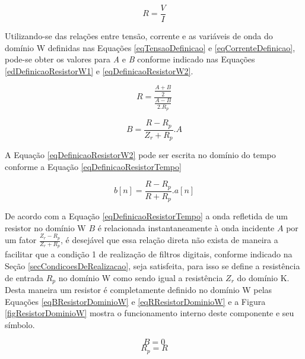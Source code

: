 	\begin{equation}
		\label{eqDefinicaoResistor}
		R = \frac{V}{I}
	\end{equation}
	
	Utilizando-se das relações entre tensão, corrente e as variáveis de onda do domínio W definidas nas Equações \ref{eqTensaoDefinicao} e \ref{eqCorrenteDefinicao}, pode-se obter os valores para \textit{A} e \textit{B} conforme indicado nas Equações \ref{edDefinicaoResistorW1} e \ref{eqDefinicaoResistorW2}.
	
	\begin{equation}
		\label{edDefinicaoResistorW1}
		R = \frac{\frac{A+B}{2}}{\frac{A-B}{2.R_p}}
	\end{equation}  
	
	\begin{equation}
		\label{eqDefinicaoResistorW2}
		B = \frac{R-R_p}{Z_r+R_p}.A
	\end{equation}
	
	A Equação \ref{eqDefinicaoResistorW2} pode ser escrita no domínio do tempo conforme a Equação \ref{eqDefinicaoResistorTempo}
	
	\begin{equation}
		\label{eqDefinicaoResistorTempo}
		b[n] = \frac{R-R_p}{R+R_p}.a[n]
	\end{equation}
	
	De acordo com a Equação \ref{eqDefinicaoResistorTempo} a onda refletida de um resistor no domínio W $B$ é relacionada instantaneamente à onda incidente $A$ por um fator $\frac{Z_r-R_p}{Z_r+R_p}$, é desejável que essa relação direta não exista de maneira a facilitar que a condição 1 de realização de filtros digitais, conforme indicado na Seção \ref{secCondicoesDeRealizacao}, seja satisfeita, para isso se define a resistência de entrada $R_p$ no domínio W como sendo igual a resistência $Z_r$ do domínio K. Desta maneira um resistor é completamente definido no domínio W pelas Equações \ref{eqBResistorDominioW} e \ref{eqRResistorDominioW} e a Figura \ref{figResistorDominioW} mostra o funcionamento interno deste componente e seu símbolo.
	
	\begin{equation}
		\label{eqBResistorDominioW}
		B = 0
	\end{equation}   
	\begin{equation}
		\label{eqRResistorDominioW}
		R_p = R
	\end{equation}
	
